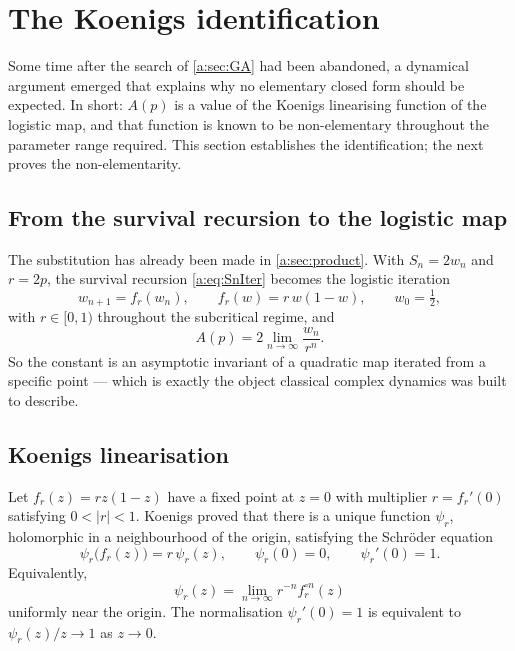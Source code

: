 \section{The Koenigs identification}
\label{a:sec:koenigs}

Some time after the search of \cref{a:sec:GA} had been abandoned, a dynamical
argument emerged that explains why no elementary closed form should be expected. In
short: $A(p)$ is a value of the Koenigs linearising function of the logistic map,
and that function is known to be non-elementary throughout the parameter range
required. This section establishes the identification; the next proves the
non-elementarity.

\subsection{From the survival recursion to the logistic map}
\label{a:sec:tologistic}

The substitution has already been made in \cref{a:sec:product}. With $S_n = 2w_n$
and $r = 2p$, the survival recursion \cref{a:eq:SnIter} becomes the logistic
iteration
\begin{equation}
\label{a:eq:logisticagain}
w_{n+1} = f_r(w_n),
\qquad
f_r(w) = r\,w(1-w),
\qquad
w_0 = \tfrac12,
\end{equation}
with $r\in[0,1)$ throughout the subcritical regime, and
\begin{equation}
\label{a:eq:Afromw}
A(p) = 2\lim_{n\to\infty}\frac{w_n}{r^n} .
\end{equation}
So the constant is an asymptotic invariant of a quadratic map iterated from a
specific point --- which is exactly the object classical complex dynamics was built
to describe.

\subsection{Koenigs linearisation}
\label{a:sec:koenigsdef}

\begin{definition}
\label{a:def:koenigs}
Let $f_r(z) = rz(1-z)$ have a fixed point at $z=0$ with multiplier
$r = f_r'(0)$ satisfying $0<|r|<1$. Koenigs \cite{Koenigs1884} proved that there
is a unique function $\psi_r$, holomorphic in a neighbourhood of the origin,
satisfying the Schröder equation
\begin{equation}
\label{a:eq:schroder}
\psi_r\bigl(f_r(z)\bigr) = r\,\psi_r(z),
\qquad
\psi_r(0)=0,
\qquad
\psi_r'(0)=1 .
\end{equation}
Equivalently,
\begin{equation}
\label{a:eq:koenigslimit}
\psi_r(z) = \lim_{n\to\infty}r^{-n}f_r^{\circ n}(z)
\end{equation}
uniformly near the origin. The normalisation $\psi_r'(0)=1$ is equivalent to
$\psi_r(z)/z\to1$ as $z\to0$.
\end{definition}

